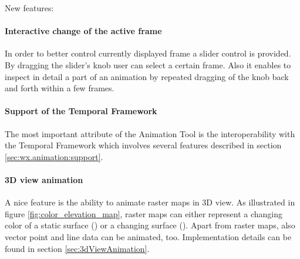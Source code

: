 \documentclass[a4paper,12pt]{book}
\newcommand{\tf}{Temporal Framework\xspace}
\newcommand{\at}{Animation Tool\xspace}
\begin{document}
New features:
\paragraph{Interactive change of the active frame}
In order to better control currently displayed frame a slider control is provided.
By dragging the slider's knob user can select a certain frame.
Also it enables to inspect in detail a part of an animation
by repeated dragging of the knob back and forth within a few frames.
      
\paragraph{Support of the \tf}
The most important attribute of the \at is the interoperability with the \tf
which involves several features described in section \ref{sec:wx.animation:support}.
      

\paragraph{3D view animation}
A nice feature is the ability to animate raster maps in 3D view.
As illustrated in figure \ref{fig:color_elevation_map},
raster maps can either represent a changing color of a static surface () or
a changing surface ().
Apart from raster maps, also vector point and line data can be animated, too.
Implementation details can be found in section \ref{sec:3dViewAnimation}.
\end{document}

